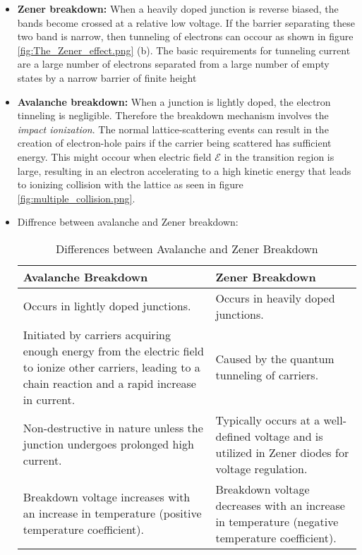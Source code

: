 \begin{itemize}
    \item \textbf{Zener breakdown:}
    \subitem When a heavily doped junction is reverse biased, the bands become crossed at a relative low voltage. If the barrier separating these two band is narrow, then tunneling of electrons can occour as shown in figure \ref{fig:The_Zener_effect.png} (b). The basic requirements for tunneling current are a large number of electrons separated from a large number of empty states by a narrow barrier of finite height
    \subitem {}
    \item \textbf{Avalanche breakdown:}
    \subitem When a junction is lightly doped, the electron tinneling is negligible. Therefore the breakdown mechanism involves the \textit{impact ionization}. The normal lattice-scattering events can result in the creation of electron-hole pairs if the carrier being scattered has sufficient energy. This might occour when electric field $\mathscr{E}$ in the transition region is large, resulting in an electron accelerating to a high kinetic energy that leads to ionizing collision with the lattice as seen in figure \ref{fig:multiple_collision.png}.
    \subitem {}
    \item Diffrence between avalanche and Zener breakdown:
    \subitem \begin{table}[H]
        \centering
        \begin{tabularx}{\textwidth}{|X|X|}
            \hline
            \textbf{Avalanche Breakdown} & \textbf{Zener Breakdown} \\
            \hline
            Occurs in lightly doped junctions. & Occurs in heavily doped junctions. \\
            \hline
            Initiated by carriers acquiring enough energy from the electric field to ionize other carriers, leading to a chain reaction and a rapid increase in current. & Caused by the quantum tunneling of carriers. \\
            \hline
            Non-destructive in nature unless the junction undergoes prolonged high current. & Typically occurs at a well-defined voltage and is utilized in Zener diodes for voltage regulation. \\
            \hline
            Breakdown voltage increases with an increase in temperature (positive temperature coefficient). & Breakdown voltage decreases with an increase in temperature (negative temperature coefficient). \\
            \hline
        \end{tabularx}
        \caption{Differences between Avalanche and Zener Breakdown}
        \label{tab:differences}
    \end{table}
\end{itemize}



